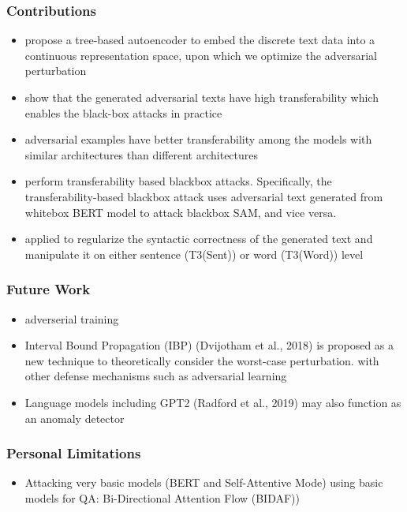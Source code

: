 \documentclass{article}
\begin{document}
\begin{flushleft}
\subsubsection*{Contributions}
\begin{itemize}
  \item propose a tree-based autoencoder to embed the discrete text data into a continuous representation space, upon which we optimize the adversarial perturbation
  \item show that the generated adversarial texts have high transferability which enables the black-box attacks in practice
  \item adversarial examples have better transferability among the models with similar architectures than different architectures
\item perform transferability based blackbox attacks. Specifically, the transferability-based blackbox attack uses adversarial text generated from whitebox BERT model to attack blackbox SAM, and vice versa.
\item applied to regularize the syntactic correctness of the generated text and manipulate it on either sentence (T3(Sent)) or word (T3(Word)) level 
\end{itemize}

\subsubsection*{Future Work}
\begin{itemize}
  \item adverserial training
  \item Interval Bound Propagation (IBP) (Dvijotham et al., 2018) is proposed as a new technique to theoretically consider the worst-case perturbation. with other defense mechanisms such as adversarial learning
  \item Language models including GPT2 (Radford et al., 2019) may also function as an anomaly detector
\end{itemize}

\subsubsection*{Personal Limitations}
\begin{itemize}
    \item Attacking very basic models (BERT and Self-Attentive Mode) using basic models for QA: Bi-Directional Attention Flow (BIDAF))
\end{itemize}



\end{flushleft}
\end{document}
